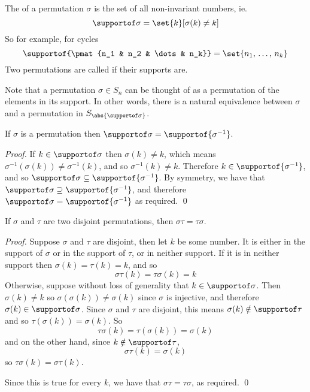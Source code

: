 \begin{defn*}

    The  of a permutation $\sigma$ is the set of all non-invariant numbers, ie.
    \[ \supportof\sigma = \set{k}[\sigma(k)\neq k] \]
    So for example, for cycles
    \[ \supportof{\pmat{n_1 & n_2 & \dots & n_k}} = \set{n_1,\,\dots,\,n_k} \]
    Two permutations are called  if their supports are.

\end{defn*}

Note that a permutation $\sigma\in S_n$ can be thought of as a permutation of the elements in its support.
In other words, there is a natural equivalence between $\sigma$ and a permutation in $S_{\abs{\supportof\sigma}}$.

\begin{prop*}

    If $\sigma$ is a permutation then $\supportof\sigma=\supportof{\sigma^{-1}}$.

\end{prop*}

\begin{proof}

    If $k\in\supportof\sigma$ then $\sigma(k)\neq k$, which means $\sigma^{-1}(\sigma(k))\neq\sigma^{-1}(k)$, and so $\sigma^{-1}(k)\neq k$.
    Therefore $k\in\supportof{\sigma^{-1}}$, and so $\supportof\sigma\subseteq\supportof{\sigma^{-1}}$.
    By symmetry, we have that $\supportof\sigma\supseteq\supportof{\sigma^{-1}}$, and therefore $\supportof\sigma=\supportof{\sigma^{-1}}$ as required.
    \qed

\end{proof}

\begin{prop*}

    If $\sigma$ and $\tau$ are two disjoint permutations, then $\sigma\tau=\tau\sigma$.

\end{prop*}

\begin{proof}

    Suppose $\sigma$ and $\tau$ are disjoint, then let $k$ be some number.
    It is either in the support of $\sigma$ or in the support of $\tau$, or in neither support.
    If it is in neither support then $\sigma(k)=\tau(k)=k$, and so
    \[ \sigma\tau(k) = \tau\sigma(k) = k \]
    Otherwise, suppose without loss of generality that $k\in\supportof\sigma$.
    Then $\sigma(k)\neq k$ so $\sigma(\sigma(k))\neq\sigma(k)$ since $\sigma$ is injective, and therefore $\sigma(k)\in\supportof\sigma$.
    Since $\sigma$ and $\tau$ are disjoint, this means $\sigma(k)\notin\supportof\tau$ and so $\tau(\sigma(k))=\sigma(k)$.
    So
    \[ \tau\sigma(k) = \tau(\sigma(k)) = \sigma(k) \]
    and on the other hand, since $k\notin\supportof\tau$,
    \[ \sigma\tau(k) = \sigma(k) \]
    so $\tau\sigma(k)=\sigma\tau(k)$.

    Since this is true for every $k$, we have that $\sigma\tau=\tau\sigma$, as required.
    \qed

\end{proof}

